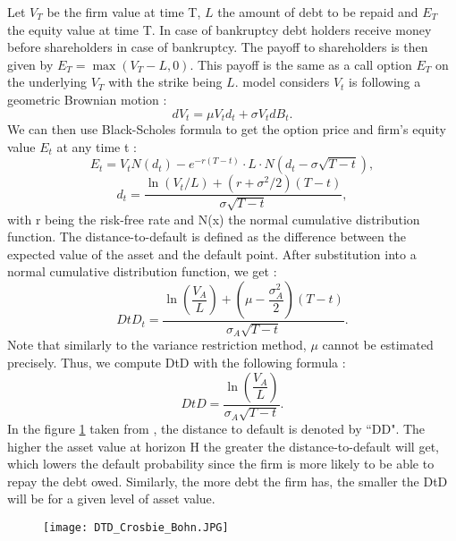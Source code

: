 Let $V_T$ be the firm value at time T, $L$ the amount of debt to be repaid and $E_T$ the equity value at time T. In case of bankruptcy debt holders receive money before shareholders in case of bankruptcy. The payoff to shareholders is then given by $E_T = \max(V_T - L,0)$. This payoff is the same as a call option $E_T$ on the underlying $V_T$ with the strike being $L$. \citet{Merton1974} model considers $V_t$ is following a geometric Brownian motion :
\begin{equation*}
dV_t = \mu V_t d_t + \sigma V_t dB_t.
\end{equation*}
We can then use Black-Scholes formula to get the option price and firm's equity value $E_t$ at any time t :
\begin{equation} \label{blackscholes}
E_t = V_t N(d_t) - e^{-r(T-t)}\cdot L \cdot N(d_t - \sigma \sqrt{T-t}),
\end{equation}
\begin{equation*}
d_t = \dfrac{\ln(V_t/L)+(r+\sigma^2/2)(T-t)}{\sigma \sqrt{T-t}},
\end{equation*}
with r being the risk-free rate and N(x) the normal cumulative distribution function.
The distance-to-default is defined as the difference between the expected value of the asset and the default point. After substitution into a normal cumulative distribution function, we get :
\begin{equation}
DtD_t = \dfrac{\ln(\dfrac{V_A}{L})+(\mu-\dfrac{\sigma_A^2}{2})(T-t)}{\sigma_A \sqrt{T-t}}.
\end{equation}
Note that similarly to the variance restriction method, $\mu$ cannot be estimated precisely. Thus, we compute DtD with the following formula :
\begin{equation}
DtD = \dfrac{\ln(\dfrac{V_A}{L})}{\sigma_A \sqrt{T-t}}.
\end{equation}
In the figure \ref{fig:DD} taken from \citet{KMV}, the distance to default is denoted by ``DD". The higher the asset value at horizon H the greater the distance-to-default will get, which lowers the default probability since the firm is more likely to be able to repay the debt owed. Similarly, the more debt the firm has, the smaller the DtD will be for a given level of asset value.

\begin{figure}[h!]
\centering
\texttt{[image: DTD\_Crosbie\_Bohn.JPG]} 
\label{fig:DD}
\end{figure}



